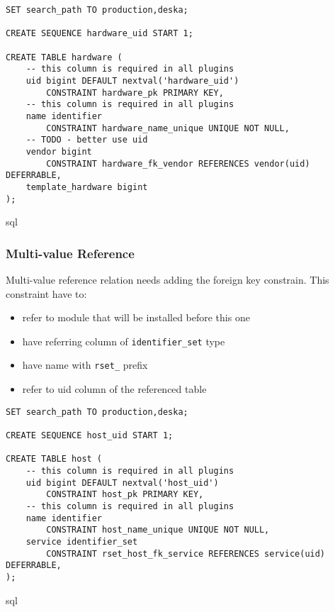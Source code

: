 \documentclass[deska]{subfiles}
\begin{document}
\begin{verbatim}
SET search_path TO production,deska;

CREATE SEQUENCE hardware_uid START 1;

CREATE TABLE hardware (
    -- this column is required in all plugins
    uid bigint DEFAULT nextval('hardware_uid')
        CONSTRAINT hardware_pk PRIMARY KEY,
    -- this column is required in all plugins
    name identifier
        CONSTRAINT hardware_name_unique UNIQUE NOT NULL,
    -- TODO - better use uid
    vendor bigint 
        CONSTRAINT hardware_fk_vendor REFERENCES vendor(uid) DEFERRABLE,
    template_hardware bigint
);
\end{verbatim}{sql}


\subsubsection{Multi-value Reference}
Multi-value reference relation needs adding the foreign key constrain. This constraint have to:
\begin{itemize}
    \item refer to module that will be installed before this one
    \item have referring column of {\tt identifier\_set} type
    \item have name with {\tt rset\_} prefix
    \item refer to uid column of the referenced table
\end{itemize}

\begin{verbatim}
SET search_path TO production,deska;

CREATE SEQUENCE host_uid START 1;

CREATE TABLE host (
    -- this column is required in all plugins
    uid bigint DEFAULT nextval('host_uid')
        CONSTRAINT host_pk PRIMARY KEY,
    -- this column is required in all plugins
    name identifier
        CONSTRAINT host_name_unique UNIQUE NOT NULL,
    service identifier_set
        CONSTRAINT rset_host_fk_service REFERENCES service(uid) DEFERRABLE,
);
\end{verbatim}{sql}
\end{document}

